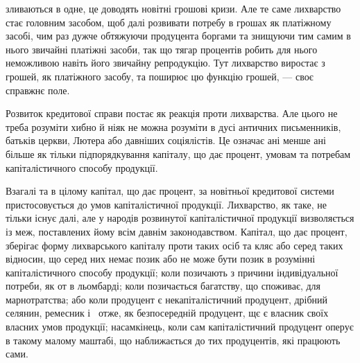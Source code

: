 \parcont{}  %
зливаються в одне, це доводять новітні грошові кризи. Але те саме лихварство стає
головним засобом, щоб далі розвивати потребу в грошах як платіжному засобі,
чим раз дужче обтяжуючи продуцента боргами та знищуючи тим самим в нього
звичайні платіжні засоби, так що тягар процентів робить для нього неможливою
навіть його звичайну репродукцію. Тут лихварство виростає з грошей, як платіжного
засобу, та поширює цю функцію грошей, — своє справжнє поле.

Розвиток кредитової справи постає як реакція проти лихварства. Але цього
не треба розуміти хибно й ніяк не можна розуміти в дусі античних письменників,
батьків церкви, Лютера або давніших соціялістів. Це означає ані менше ані
більше як тільки підпорядкування капіталу, що дає процент, умовам та потребам
капіталістичного способу продукції.

Взагалі та в цілому капітал, що дає процент, за новітньої кредитової системи
пристосовується до умов капіталістичної продукції. Лихварство, як таке, не
тільки існує далі, але у народів розвинутої капіталістичної продукції визволяється
із меж, поставлених йому всім давнім законодавством. Капітал, що дає
процент, зберігає форму лихварського капіталу проти таких осіб та кляс або
серед таких відносин, що серед них немає позик або не може бути позик в розумінні
капіталістичного способу продукції; коли позичають з причини індивідуальної
потреби, як от в льомбарді; коли позичається багатству, що споживає,
для марнотратства; або коли продуцент є некапіталістичний продуцент, дрібний
селянин, ремесник і~ отже, як безпосередній продуцент, щє є власник своїх
власних умов продукції; насамкінець, коли сам капіталістичний продуцент оперує
в такому малому маштабі, що наближається до тих продуцентів, які працюють сами.

